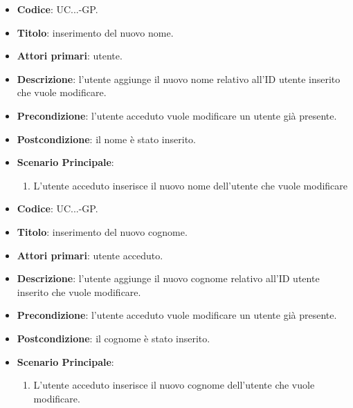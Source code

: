 				
				\begin{itemize}
					\item \textbf{Codice}: UC\theuccount.\thesubuccount.\thesubsubuccount.\thesubsubsubuccount-GP.
					\item \textbf{Titolo}: inserimento del nuovo nome.
					\item \textbf{Attori primari}: utente.
					\item \textbf{Descrizione}: l'utente aggiunge il nuovo nome relativo all'ID utente inserito che vuole modificare.
					\item \textbf{Precondizione}: l'utente acceduto vuole modificare un utente già presente.
					\item \textbf{Postcondizione}: il nome è stato inserito.
					\item \textbf{Scenario Principale}:
					\begin{enumerate}
						\item L'utente acceduto inserisce il nuovo nome dell'utente che vuole modificare
					\end{enumerate}
				\end{itemize}
			
				
				\begin{itemize}
					\item \textbf{Codice}: UC\theuccount.\thesubuccount.\thesubsubuccount.\thesubsubsubuccount-GP.
					\item \textbf{Titolo}: inserimento del nuovo cognome.
					\item \textbf{Attori primari}: utente acceduto.
					\item \textbf{Descrizione}: l'utente aggiunge il nuovo cognome relativo all'ID utente inserito che vuole modificare.
					\item \textbf{Precondizione}: l'utente acceduto vuole modificare un utente già presente.
					\item \textbf{Postcondizione}: il cognome è stato inserito.
					\item \textbf{Scenario Principale}:
					\begin{enumerate}
						\item L'utente acceduto inserisce il nuovo cognome dell'utente che vuole modificare.
					\end{enumerate}
				\end{itemize}
			

